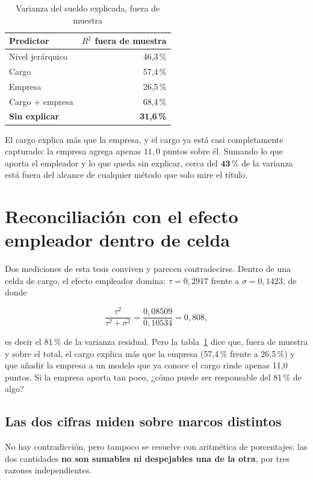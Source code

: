 \documentclass[12pt,a4paper,oneside]{report}
\begin{document}
\begin{table}[h]
\centering
\caption{Varianza del sueldo explicada, fuera de muestra}
\label{tab:varianza}
\begin{tabular}{lr}
\toprule
Predictor & $R^2$ fuera de muestra \\
\midrule
Nivel jerárquico & 46,3\,\% \\
Cargo & 57,4\,\% \\
Empresa & 26,5\,\% \\
Cargo $+$ empresa & 68,4\,\% \\
\midrule
\textbf{Sin explicar} & \textbf{31,6\,\%} \\
\bottomrule
\end{tabular}
\end{table}

El cargo explica más que la empresa, y el cargo ya está casi completamente capturado: la
empresa agrega apenas $11{,}0$ puntos sobre él. Sumando lo que aporta el empleador y lo que
queda sin explicar, cerca del $\mathbf{43\,\%}$ de la varianza está fuera del alcance de
cualquier método que solo mire el título.

\section{Reconciliación con el efecto empleador dentro de celda}
\label{sec:reconciliacion}

Dos mediciones de esta tesis conviven y parecen contradecirse. Dentro de una celda de
cargo, el efecto empleador domina: $\tau = 0{,}2917$ frente a $\sigma = 0{,}1423$, de donde

\begin{equation}
\frac{\tau^2}{\tau^2 + \sigma^2}
= \frac{0{,}08509}{0{,}10534} = 0{,}808 ,
\label{eq:intraclase}
\end{equation}

es decir el 81\,\% de la varianza residual. Pero la tabla~\ref{tab:varianza} dice que,
fuera de muestra y sobre el total, el cargo explica más que la empresa (57,4\,\% frente a
26,5\,\%) y que añadir la empresa a un modelo que ya conoce el cargo rinde apenas 11,0
puntos. Si la empresa aporta tan poco, ¿cómo puede ser responsable del 81\,\% de algo?

\subsection{Las dos cifras miden sobre marcos distintos}

No hay contradicción, pero tampoco se resuelve con aritmética de porcentajes: las dos
cantidades \textbf{no son sumables ni despejables una de la otra}, por tres razones
independientes.
\end{document}
